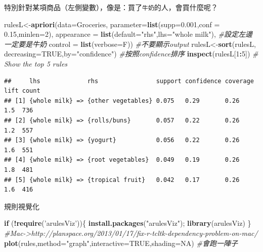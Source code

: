 \documentclass[
]{book}
\newenvironment{Shaded}{\begin{snugshade}}{\end{snugshade}}
\newcommand{\CommentTok}[1]{\textcolor[rgb]{0.56,0.35,0.01}{\textit{#1}}}
\newcommand{\ControlFlowTok}[1]{\textcolor[rgb]{0.13,0.29,0.53}{\textbf{#1}}}
\newcommand{\DataTypeTok}[1]{\textcolor[rgb]{0.13,0.29,0.53}{#1}}
\newcommand{\DecValTok}[1]{\textcolor[rgb]{0.00,0.00,0.81}{#1}}
\newcommand{\FloatTok}[1]{\textcolor[rgb]{0.00,0.00,0.81}{#1}}
\newcommand{\KeywordTok}[1]{\textcolor[rgb]{0.13,0.29,0.53}{\textbf{#1}}}
\newcommand{\NormalTok}[1]{#1}
\newcommand{\OperatorTok}[1]{\textcolor[rgb]{0.81,0.36,0.00}{\textbf{#1}}}
\newcommand{\OtherTok}[1]{\textcolor[rgb]{0.56,0.35,0.01}{#1}}
\newcommand{\StringTok}[1]{\textcolor[rgb]{0.31,0.60,0.02}{#1}}
\begin{document}
特別針對某項商品（左側變數），像是：買了\texttt{牛奶}的人，會買什麼呢？

\begin{Shaded}
\begin{Highlighting}[]
\NormalTok{rulesL<-}\KeywordTok{apriori}\NormalTok{(}\DataTypeTok{data=}\NormalTok{Groceries, }\DataTypeTok{parameter=}\KeywordTok{list}\NormalTok{(}\DataTypeTok{supp=}\FloatTok{0.001}\NormalTok{,}\DataTypeTok{conf =} \FloatTok{0.15}\NormalTok{,}\DataTypeTok{minlen=}\DecValTok{2}\NormalTok{),}
        \DataTypeTok{appearance =} \KeywordTok{list}\NormalTok{(}\DataTypeTok{default=}\StringTok{"rhs"}\NormalTok{,}\DataTypeTok{lhs=}\StringTok{"whole milk"}\NormalTok{), }\CommentTok{#設定左邊一定要是牛奶}
        \DataTypeTok{control =} \KeywordTok{list}\NormalTok{(}\DataTypeTok{verbose=}\NormalTok{F)) }\CommentTok{#不要顯示output}
\NormalTok{rulesL<-}\KeywordTok{sort}\NormalTok{(rulesL, }\DataTypeTok{decreasing=}\OtherTok{TRUE}\NormalTok{,}\DataTypeTok{by=}\StringTok{"confidence"}\NormalTok{) }\CommentTok{#按照confidence排序}
\KeywordTok{inspect}\NormalTok{(rulesL[}\DecValTok{1}\OperatorTok{:}\DecValTok{5}\NormalTok{]) }\CommentTok{# Show the top 5 rules}
\end{Highlighting}
\end{Shaded}

\begin{verbatim}
##     lhs             rhs                support confidence coverage lift count
## [1] {whole milk} => {other vegetables} 0.075   0.29       0.26     1.5  736  
## [2] {whole milk} => {rolls/buns}       0.057   0.22       0.26     1.2  557  
## [3] {whole milk} => {yogurt}           0.056   0.22       0.26     1.6  551  
## [4] {whole milk} => {root vegetables}  0.049   0.19       0.26     1.8  481  
## [5] {whole milk} => {tropical fruit}   0.042   0.17       0.26     1.6  416
\end{verbatim}

規則視覺化

\begin{Shaded}
\begin{Highlighting}[]
\ControlFlowTok{if}\NormalTok{ (}\OperatorTok{!}\KeywordTok{require}\NormalTok{(}\StringTok{'arulesViz'}\NormalTok{))\{}
  \KeywordTok{install.packages}\NormalTok{(}\StringTok{"arulesViz"}\NormalTok{); }
  \KeywordTok{library}\NormalTok{(arulesViz)}
\NormalTok{\}}
\CommentTok{#Mac->http://planspace.org/2013/01/17/fix-r-tcltk-dependency-problem-on-mac/}
\KeywordTok{plot}\NormalTok{(rules,}\DataTypeTok{method=}\StringTok{"graph"}\NormalTok{,}\DataTypeTok{interactive=}\OtherTok{TRUE}\NormalTok{,}\DataTypeTok{shading=}\OtherTok{NA}\NormalTok{) }\CommentTok{#會跑一陣子}
\end{Highlighting}
\end{Shaded}
\end{document}
